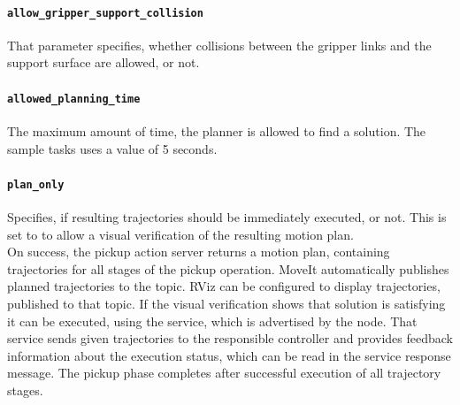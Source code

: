 \paragraph{\texttt{allow\_gripper\_support\_collision}} That parameter specifies, whether collisions between the gripper links and the support surface are allowed, or not.
\paragraph{\texttt{allowed\_planning\_time}} The maximum amount of time, the planner is allowed to find a solution. The sample tasks uses a value of 5 seconds.
\paragraph{\texttt{plan\_only}} Specifies, if resulting trajectories should be immediately executed, or not. This is set to  to allow a visual verification of the resulting motion plan. \\

On success, the pickup action server returns a motion plan, containing trajectories for all stages of the pickup operation. MoveIt automatically publishes planned trajectories to the  topic. RViz can be configured to display trajectories, published to that topic. If the visual verification shows that solution is satisfying it can be executed, using the  service, which is advertised by the  node. That service sends given trajectories to the responsible controller and provides feedback information about the execution status, which can be read in the service response message. The pickup phase completes after successful execution of all trajectory stages.

